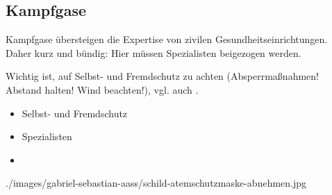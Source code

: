% 
% 




\subsection{Kampfgase}

{%
\noindent Kampfgase übersteigen die Expertise von zivilen Gesundheitseinrichtungen. 
Daher kurz und bündig: Hier müssen Spezialisten beigezogen werden.

Wichtig ist, auf Selbst- und Fremdschutz zu achten 
(Absperrmaßnahmen! Abstand halten! Wind beachten!), vgl. auch
.
}{
\begin{itemize}
  \item Selbst- und Fremdschutz
  \item Spezialisten
  \item {}
\end{itemize}
}
{./images/gabriel-sebastian-aass/schild-atemschutzmaske-abnehmen.jpg}
{}
{}


